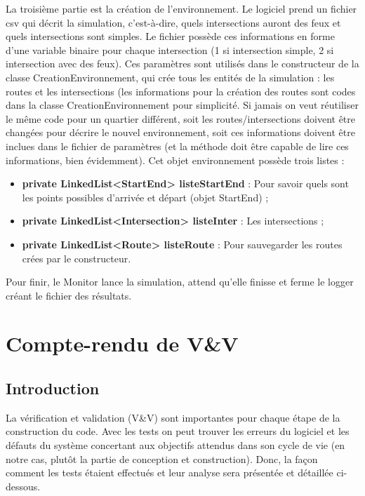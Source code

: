 \documentclass[12pt]{article} %
\begin{document}
La troisième partie est la création de l'environnement. Le logiciel prend un fichier csv qui décrit la simulation, c'est-à-dire, quels intersections auront des feux et quels intersections sont simples. Le fichier possède ces informations en forme d'une variable binaire pour chaque intersection (1 si intersection simple, 2 si intersection avec des feux).
%
Ces paramètres sont utilisés dans le constructeur de la classe CreationEnvironnement, qui crée tous les entités de la simulation : les routes et les intersections (les informations pour la création des routes sont codes dans la classe CreationEnvironnement pour simplicité. Si jamais on veut réutiliser le même code pour un quartier différent, soit les routes/intersections doivent être changées pour décrire le nouvel environnement, soit ces informations doivent être inclues dans le fichier de paramètres (et la méthode doit être capable de lire ces informations, bien évidemment).
%
Cet objet environnement possède trois listes :
\begin{itemize}
\item \textbf{private LinkedList<StartEnd> listeStartEnd} : Pour savoir quels sont les points possibles d'arrivée et départ (objet StartEnd) ;\\

\item \textbf{private LinkedList<Intersection> listeInter} : Les intersections ;\\

\item \textbf{private LinkedList<Route> listeRoute} : Pour sauvegarder les routes crées par le constructeur.
\end{itemize} 

Pour finir, le Monitor lance la simulation, attend qu'elle finisse et ferme le logger créant le fichier des résultats.

\newpage
\section{Compte-rendu de V\&V}\label{VV}
\subsection{Introduction}

La vérification et validation (V\&V) sont importantes pour chaque étape de la construction du code. Avec les tests on peut trouver les erreurs du logiciel et les défauts du système concertant aux objectifs attendus dans son cycle de vie (en notre cas, plutôt la partie de conception et construction). Donc, la façon comment les tests étaient effectués et leur analyse sera présentée et détaillée ci-dessous.
\end{document}
